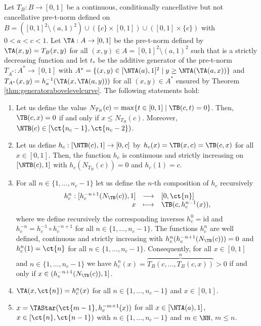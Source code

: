 \begin{lemma}\label{lem:TB}
	Let $T_B : B \to [0,1]$ be a continuous, conditionally cancellative but not cancellative pre-t-norm defined on $B=([0,1]^2 \setminus (a,1)^2) \cup (\{c\} \times [0,1]) \cup ([0,1] \times \{c\})$ with $0<a<c<1$. Let $\TA : A \to [0,1]$ be the pre-t-norm defined by $\TA(x,y)=T_B(x,y)$ for all $(x,y) \in A =[0,1]^2 \setminus (a,1)^2$ such that \NTA is a strictly decreasing function and let $t_*$ be the additive generator of the pre-t-norm $T_{A^*}:A^* \to [0,1]$ with $A^* = \{(x,y) \in [\NTA(a),1]^2 \mid y \geq \NTA(\TA(a,x))\}$ and $T_{A^*}(x,y)=h_a^{-1}(\TA(x,\TA(a,y)))$ for all $(x,y) \in A^*$ ensured by Theorem \ref{thm:generatorabovelevelcurve}. The following statements hold:
	\begin{enumerate}[label=(\roman*)]
		\item Let us define the value $N_{T_B}(c) = \max \{t \in [0,1] \mid \TB(c,t)=0\}$. Then, $\TB(c,x)=0$ if and only if $x \leq N_{T_B}(c)$. Moreover, $\NTB(c) \in [\ct{n_c-1},\ct{n_c-2})$.
		\item Let us define $h_c : [\NTB(c),1] \to [0,c]$ by $h_c(x)=\TB(x,c)=\TB(c,x)$ for all $x \in [0,1]$. Then, the function $h_c$ is continuous and strictly increasing on $[\NTB(c),1]$ with $h_c(N_{T_B}(c))=0$ and $h_c(1)=c$.
		\item For all $n \in \{1,\dots,n_c-1\}$ let us define the $n$-th composition of $h_c$ recursively
		$$
		\begin{array}{rcl}
			h_c^n:[h_c^{-n+1}(N_{\TB}(c)),1]&\longrightarrow&[0,\ct{n}]\\
			x&\longmapsto& \TB(c,h_c^{n-1}(x)),
		\end{array}
		$$
		where we define recursively the corresponding inverses $h_c^{0}=\text{id}$ and $h_c^{-n} = h_c^{-1} \circ h_c^{-n+1}$ for all $n \in \{1,\dots,n_c-1\}$. The functions $h_c^n$ are well defined, continuous and strictly increasing with   $h_c^n(h_c^{-n+1}(N_{\TB}(c)))=0$ and $h_c^n(1)=\ct{n}$ for all $n \in \{1,\dots,n_c-1\}$. Consequently,  for all $x \in [0,1]$ and $n \in \{1,\dots,n_c-1\}$ we have $h_c^{n}(x)=\overbrace{T_B(c,\dots, T_B(c,x))}^n > 0$ if and only if $x \in (h_c^{-n+1}(N_{\TB}(c)),1]$.
		\item $\TA(x,\ct{n})=h_c^{n}(x)$ for all $n \in \{1,\dots,n_c-1\}$ and $x \in [0,1]$.
		\item $x=\TAStar(\ct{m-1},h_c^{-m+1}(x))$ for all $x \in [\NTA(a),1]$, $x \in [\ct{n},\ct{n-1})$ with $n \in \{1,\dots,n_c-1\}$ and $m \in \NN$, $m \leq n$.
	\end{enumerate}
\end{lemma}

